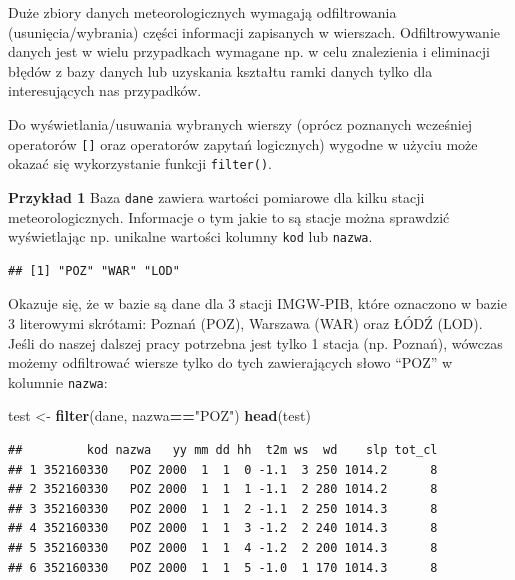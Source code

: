 \documentclass[]{book}
\newenvironment{Shaded}{\begin{snugshade}}{\end{snugshade}}
\newcommand{\KeywordTok}[1]{\textcolor[rgb]{0.13,0.29,0.53}{\textbf{#1}}}
\newcommand{\StringTok}[1]{\textcolor[rgb]{0.31,0.60,0.02}{#1}}
\newcommand{\CommentTok}[1]{\textcolor[rgb]{0.56,0.35,0.01}{\textit{#1}}}
\newcommand{\OperatorTok}[1]{\textcolor[rgb]{0.81,0.36,0.00}{\textbf{#1}}}
\newcommand{\NormalTok}[1]{#1}
\theoremstyle{definition}
\theoremstyle{definition}
\theoremstyle{definition}
\theoremstyle{remark}
\begin{document}
Duże zbiory danych meteorologicznych wymagają odfiltrowania
(usunięcia/wybrania) części informacji zapisanych w wierszach.
Odfiltrowywanie danych jest w wielu przypadkach wymagane np. w celu
znalezienia i eliminacji błędów z bazy danych lub uzyskania kształtu
ramki danych tylko dla interesujących nas przypadków.

Do wyświetlania/usuwania wybranych wierszy (oprócz poznanych wcześniej
operatorów \texttt{{[}{]}} oraz operatorów zapytań logicznych) wygodne w
użyciu może okazać się wykorzystanie funkcji \texttt{filter()}.

\textbf{Przykład 1} Baza \texttt{dane} zawiera wartości pomiarowe dla
kilku stacji meteorologicznych. Informacje o tym jakie to są stacje
można sprawdzić wyświetlając np. unikalne wartości kolumny \texttt{kod}
lub \texttt{nazwa}.

\begin{Shaded}
\end{Shaded}

\begin{verbatim}
## [1] "POZ" "WAR" "LOD"
\end{verbatim}

Okazuje się, że w bazie są dane dla 3 stacji IMGW-PIB, które oznaczono w
bazie 3 literowymi skrótami: Poznań (POZ), Warszawa (WAR) oraz ŁÓDŹ
(LOD). Jeśli do naszej dalszej pracy potrzebna jest tylko 1 stacja (np.
Poznań), wówczas możemy odfiltrować wiersze tylko do tych zawierających
słowo ``POZ'' w kolumnie \texttt{nazwa}:

\begin{Shaded}
\begin{Highlighting}[]
\NormalTok{test <-}\StringTok{ }\KeywordTok{filter}\NormalTok{(dane, nazwa}\OperatorTok{==}\StringTok{"POZ"}\NormalTok{)}
\KeywordTok{head}\NormalTok{(test)}
\end{Highlighting}
\end{Shaded}

\begin{verbatim}
##         kod nazwa   yy mm dd hh  t2m ws  wd    slp tot_cl
## 1 352160330   POZ 2000  1  1  0 -1.1  3 250 1014.2      8
## 2 352160330   POZ 2000  1  1  1 -1.1  2 280 1014.2      8
## 3 352160330   POZ 2000  1  1  2 -1.1  2 250 1014.3      8
## 4 352160330   POZ 2000  1  1  3 -1.2  2 240 1014.3      8
## 5 352160330   POZ 2000  1  1  4 -1.2  2 200 1014.3      8
## 6 352160330   POZ 2000  1  1  5 -1.0  1 170 1014.3      8
\end{verbatim}
\end{document}
